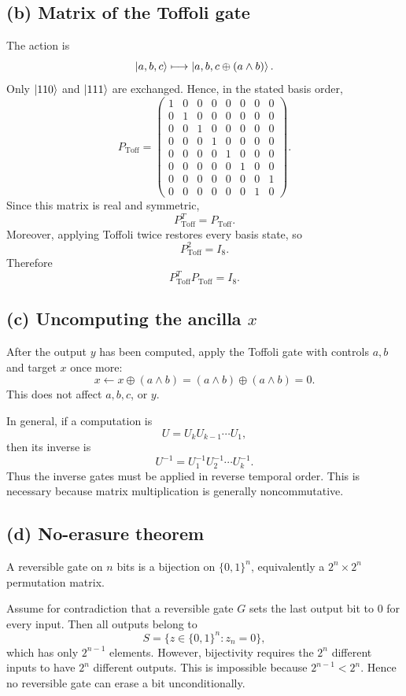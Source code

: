 \documentclass[11pt,a4paper]{article}
\begin{document}
\subsection*{(b) Matrix of the Toffoli gate}
The action is
\[
\ket{a,b,c}\longmapsto\ket{a,b,c\oplus(a\land b)}.
\]
Only $\ket{110}$ and $\ket{111}$ are exchanged. Hence, in the stated basis order,
\[
P_{\mathrm{Toff}}=
\begin{pmatrix}
1&0&0&0&0&0&0&0\\
0&1&0&0&0&0&0&0\\
0&0&1&0&0&0&0&0\\
0&0&0&1&0&0&0&0\\
0&0&0&0&1&0&0&0\\
0&0&0&0&0&1&0&0\\
0&0&0&0&0&0&0&1\\
0&0&0&0&0&0&1&0
\end{pmatrix}.
\]
Since this matrix is real and symmetric,
\[
P_{\mathrm{Toff}}^T=P_{\mathrm{Toff}}.
\]
Moreover, applying Toffoli twice restores every basis state, so
\[
P_{\mathrm{Toff}}^2=I_8.
\]
Therefore
\[
P_{\mathrm{Toff}}^T P_{\mathrm{Toff}}=I_8.
\]

\subsection*{(c) Uncomputing the ancilla $x$}
After the output $y$ has been computed, apply the Toffoli gate with controls $a,b$
and target $x$ once more:
\[
x\leftarrow x\oplus(a\land b)
=(a\land b)\oplus(a\land b)=0.
\]
This does not affect $a,b,c$, or $y$.

In general, if a computation is
\[
U=U_kU_{k-1}\cdots U_1,
\]
then its inverse is
\[
U^{-1}=U_1^{-1}U_2^{-1}\cdots U_k^{-1}.
\]
Thus the inverse gates must be applied in reverse temporal order. This is necessary
because matrix multiplication is generally noncommutative.

\subsection*{(d) No-erasure theorem}
A reversible gate on $n$ bits is a bijection on $\{0,1\}^n$, equivalently a
$2^n\times 2^n$ permutation matrix.

Assume for contradiction that a reversible gate $G$ sets the last output bit to $0$
for every input. Then all outputs belong to
\[
S=\{z\in\{0,1\}^n:z_n=0\},
\]
which has only $2^{n-1}$ elements. However, bijectivity requires the $2^n$ different
inputs to have $2^n$ different outputs. This is impossible because
$2^{n-1}<2^n$. Hence no reversible gate can erase a bit unconditionally.
\end{document}
